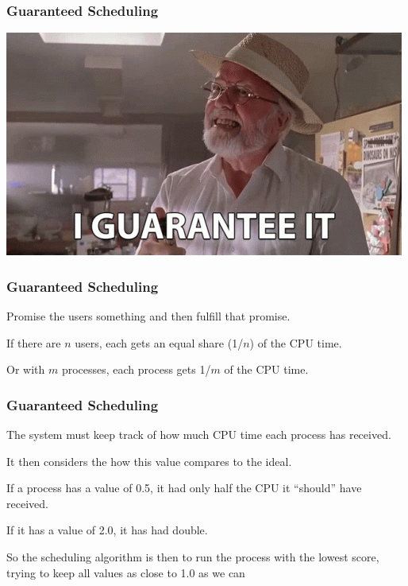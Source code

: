 \begin{frame}
\frametitle{Guaranteed Scheduling}

\begin{center}
	\includegraphics[width=\textwidth]{images/guarantee.jpg}
\end{center}

\end{frame}

\begin{frame}
\frametitle{Guaranteed Scheduling}

Promise the users something and then fulfill that promise. 

If there are $n$ users, each gets an equal share (1/$n$) of the CPU time. 

Or with $m$ processes, each process gets 1/$m$ of the CPU time.


\end{frame}

\begin{frame}
\frametitle{Guaranteed Scheduling}

The system must keep track of how much CPU time each process has received. 

It then considers the how this value compares to the ideal. 

If a process has a value of 0.5, it had only half the CPU it ``should'' have received. 

If it has a value of 2.0, it has had double. 

So the scheduling algorithm is then to run the process with the lowest score, trying to keep all values as close to 1.0 as we can

\end{frame}

